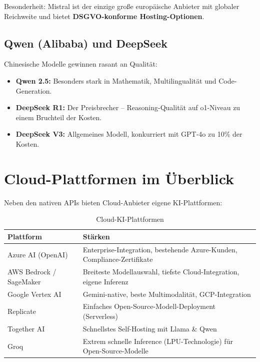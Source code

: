 Besonderheit: Mistral ist der einzige große europäische Anbieter mit globaler Reichweite und bietet \textbf{DSGVO-konforme Hosting-Optionen}.

\subsection{Qwen (Alibaba) und DeepSeek}

Chinesische Modelle gewinnen rasant an Qualität:

\begin{itemize}[leftmargin=*]
    \item \textbf{Qwen 2.5:} Besonders stark in Mathematik, Multilingualität und Code-Generation.
    \item \textbf{DeepSeek R1:} Der Preisbrecher -- Reasoning-Qualität auf o1-Niveau zu einem Bruchteil der Kosten.
    \item \textbf{DeepSeek V3:} Allgemeines Modell, konkurriert mit GPT-4o zu 10\% der Kosten.
\end{itemize}


\section{Cloud-Plattformen im Überblick}

Neben den nativen APIs bieten Cloud-Anbieter eigene KI-Plattformen:

\begin{table}[H]
\centering
\begin{tabularx}{\linewidth}{lX}
\toprule
\textbf{Plattform} & \textbf{Stärken} \\
\midrule
Azure AI (OpenAI) & Enterprise-Integration, bestehende Azure-Kunden, Compliance-Zertifikate \\
AWS Bedrock / SageMaker & Breiteste Modellauswahl, tiefste Cloud-Integration, eigene Inferenz \\
Google Vertex AI & Gemini-native, beste Multimodalität, GCP-Integration \\
Replicate & Einfaches Open-Source-Modell-Deployment (Serverless) \\
Together AI & Schnellstes Self-Hosting mit Llama \& Qwen \\
Groq & Extrem schnelle Inference (LPU-Technologie) für Open-Source-Modelle \\
\bottomrule
\end{tabularx}
\caption{Cloud-KI-Plattformen}
\label{tab:cloud}
\end{table}

